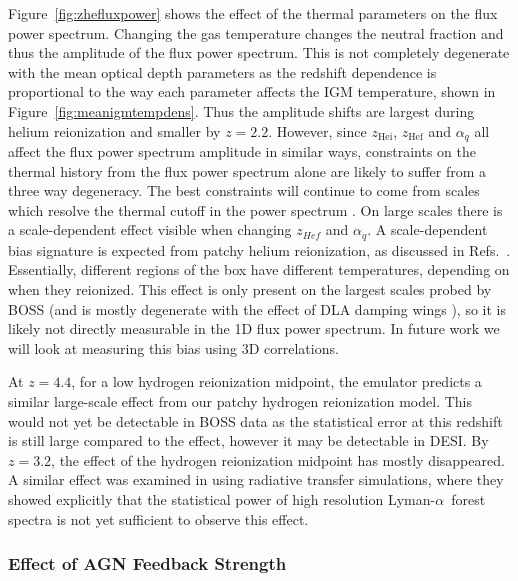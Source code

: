 \documentclass[a4paper,11pt]{article}
\newcommand{\Lya}{Lyman-$\alpha$}
\begin{document}
Figure~\ref{fig:zhefluxpower} shows the effect of the thermal parameters on the flux power spectrum. Changing the gas temperature changes the neutral fraction and thus the amplitude of the flux power spectrum. This is not completely degenerate with the mean optical depth parameters as the redshift dependence is proportional to the way each parameter affects the IGM temperature, shown in Figure~\ref{fig:meanigmtempdens}. Thus the amplitude shifts are largest during helium reionization and smaller by $z=2.2$. However, since $z_\mathrm{Hei}$, $z_\mathrm{Hef}$ and $\alpha_q$ all affect the flux power spectrum amplitude in similar ways, constraints on the thermal history from the flux power spectrum alone are likely to suffer from a three way degeneracy. The best constraints will continue to come from scales which resolve the thermal cutoff in the power spectrum \cite{Gaikwad:2021}. On large scales there is a scale-dependent effect visible when changing $z_{Hef}$ and $\alpha_q$. A scale-dependent bias signature is expected from patchy helium reionization, as discussed in Refs.~\cite{Pontzen:2014a, Pontzen:2014b,  Gontcho:2014}. Essentially, different regions of the box have different temperatures, depending on when they reionized. This effect is only present on the largest scales probed by BOSS (and is mostly degenerate with the effect of DLA damping wings \cite{Rogers:2017}), so it is likely not directly measurable in the 1D flux power spectrum. In future work we will look at measuring this bias using 3D correlations.

At $z=4.4$, for a low hydrogen reionization midpoint, the emulator predicts a similar large-scale effect from our patchy hydrogen reionization model. This would not yet be detectable in BOSS data as the statistical error at this redshift is still large compared to the effect, however it may be detectable in DESI. By $z=3.2$, the effect of the hydrogen reionization midpoint has mostly disappeared. A similar effect was examined in \cite{Molaro:2022} using radiative transfer simulations, where they showed explicitly that the statistical power of high resolution \Lya~forest spectra is not yet sufficient to observe this effect.

\subsubsection{Effect of AGN Feedback Strength}
\end{document}
